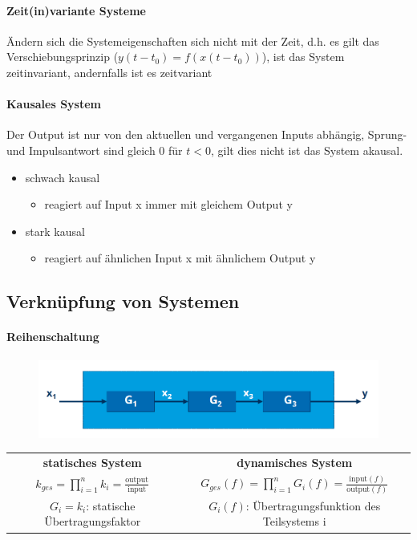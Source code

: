 \documentclass[12pt,a4paper]{article}
\begin{document}
\paragraph{Zeit(in)variante Systeme}
Ändern sich die Systemeigenschaften sich nicht mit der Zeit, d.h. es gilt das Verschiebungsprinzip ($y(t-t_0) = f(x(t-t_0))$), ist das System zeitinvariant, andernfalls ist es zeitvariant

\paragraph{Kausales System}
Der Output ist nur von den aktuellen und vergangenen Inputs abhängig, Sprung- und Impulsantwort sind gleich 0 für $t < 0$, gilt dies nicht ist das System akausal.
\begin{itemize}
\item schwach kausal
\begin{itemize}
\item reagiert auf Input x immer mit gleichem Output y
\end{itemize}
\item stark kausal
\begin{itemize}
\item reagiert auf ähnlichen Input x mit ähnlichem Output y
\end{itemize}
\end{itemize}

\subsection{Verknüpfung von Systemen}

\paragraph{Reihenschaltung}
\hspace{1pt}
\begin{figure}[H]
\includegraphics[scale=0.5]{./resources/reihenschaltung.png}
\end{figure}
\begin{tabular}{|c|c|}
\hline
\textbf{statisches System} & \textbf{dynamisches System} \\
$\displaystyle k_{ges} = \prod_{i=1}^n k_i = \frac{\text{output}}{\text{input}}$ & $\displaystyle G_{ges}(f) = \prod_{i=1}^n G_i(f) = \frac{\text{input}(f)}{\text{output}(f)}$ \\
\hline
$G_i = k_i$: statische Übertragungsfaktor & $G_i(f)$: Übertragungsfunktion des Teilsystems i \\
\hline
\end{tabular}
\end{document}
